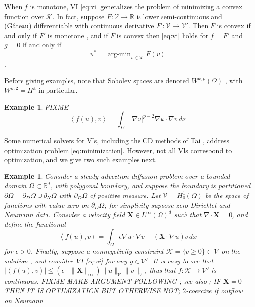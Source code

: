 \documentclass[letterpaper,final,12pt,reqno]{amsart}
\theoremstyle{cstyle}
\theoremstyle{dstyle}
\newtheorem{example}[theorem]{Example}
\numberwithin{equation}{section}
\numberwithin{figure}{section}
\numberwithin{table}{section}
\numberwithin{theorem}{section}
\newcommand{\eps}{\epsilon}
\newcommand{\RR}{\mathbb{R}}
\newcommand{\grad}{\nabla}
\newcommand{\Div}{\nabla\cdot}
\newcommand{\bX}{\mathbf{X}}
\newcommand{\cK}{\mathcal{K}}
\newcommand{\cV}{\mathcal{V}}
\newcommand{\ip}[2]{\left<#1,#2\right>}
\begin{document}
When $f$ is monotone, VI \eqref{eq:vi} generalizes the problem of minimizing a convex function over $\cK$.  In fact, suppose $F:\cV \to \RR$ is lower semi-continuous and (G\^ateau) differentiable with continuous derivative $F':\cV \to \cV'$.  Then $F$ is convex if and only if $F'$ is monotone \cite[Proposition I.5.5]{EkelandTemam1976}, and if $F$ is convex then \eqref{eq:vi} holds for $f=F'$ and $g=0$ if and only if
\begin{equation}
u^* = \operatorname{arg-min}_{v\in\cK} F(v) \label{eq:minimization}
\end{equation}
\cite[Proposition II.2.1]{EkelandTemam1976}.

Before giving examples, note that Sobolev spaces are denoted $W^{k,p}(\Omega)$ \cite{Evans2010}, with $W^{k,2}=H^k$ in particular.

\begin{example}  \label{ex:plaplacian}  FIXME
\begin{equation}
\ip{f(u)}{v} = \int_\Omega |\grad u|^{p-2} \grad u \cdot \grad v\,dx \label{eq:plaplacian}
\end{equation}
\end{example}

Some numerical solvers for VIs, including the CD methods of Tai \cite{Tai2003}, address optimization problem \eqref{eq:minimization}.  However, not all VIs correspond to optimization, and we give two such examples next.

\begin{example}  \label{ex:advectiondiffusion}  Consider a steady advection-diffusion problem over a bounded domain $\Omega \subset \RR^d$, with polygonal boundary, and suppose the boundary is partitioned $\partial\Omega = \partial_D\Omega \cup \partial_N\Omega$ with $\partial_D\Omega$ of positive measure.  Let $\cV = H_0^1(\Omega)$ be the space of functions with value zero on $\partial_D\Omega$; for simplicity suppose zero Dirichlet and Neumann data.  Consider a velocity field $\bX \in L^\infty(\Omega)^d$ such that $\Div \bX=0$, and define the functional
\begin{equation}
\ip{f(u)}{v} = \int_\Omega \eps \grad u \cdot \grad v - (\bX \cdot \grad u) v\,dx \label{eq:advectiondiffusion}
\end{equation}
for $\eps>0$.  Finally, suppose a nonnegativity constraint $\cK = \{v\ge 0\} \subset \cV$ on the solution \cite[for example]{ChangNakshatrala2017}, and consider VI \eqref{eq:vi} for any $g\in\cV'$.  It is easy to see that $|\ip{f(u)}{v}| \le (\eps + \|\bX\|_\infty) \|u\|_{\cV} \|v\|_{\cV}$, thus that $f:\cK \to \cV'$ is continuous.  FIXME  MAKE ARGUMENT FOLLOWING \cite{Elmanetal2014}; see also \cite{Kirby2010}; IF $\bX=0$ THEN IT IS OPTIMIZATION BUT OTHERWISE NOT; $2$-coercive if outflow on Neumann
\end{example}
\end{document}
